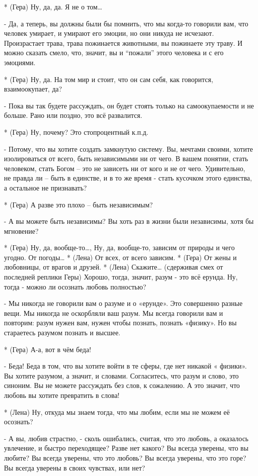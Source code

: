 * (Гера) Ну, да, да. Я не о том…

- Да, а теперь, вы должны были бы помнить, что мы когда-то говорили вам, что человек умирает, и умирают его эмоции, но они никуда не исчезают. Произрастает трава, трава пожинается животными, вы пожинаете эту траву. И можно сказать смело, что, значит, вы и “пожали” этого человека и с его эмоциями.

* (Гера) Ну, да. На том мир и стоит, что он сам себя, как говорится,  взаимоокупает, да?

- Пока вы так будете рассуждать, он будет стоять только на самоокупаемости и не больше. Рано  или поздно, это всё развалится.

* (Гера) Ну, почему? Это стопроцентный к.п.д.

- Потому, что вы хотите создать замкнутую систему. Вы, мечтами своими, хотите изолироваться от всего, быть независимыми ни от чего. В вашем понятии, стать человеком, стать Богом – это не зависеть ни от кого и не от чего. Удивительно, не правда ли – быть в единстве, и в то же время - стать кусочком этого единства, а остальное не признавать?

* (Гера) А разве это плохо – быть независимым?

- А вы можете быть независимы? Вы хоть раз в жизни были независимы, хотя бы мгновение?

* (Гера) Ну, да, вообще-то…, Ну, да,  вообще-то, зависим от природы и чего угодно. От погоды…
* (Лена) От всех, от всего зависим.
* (Гера) От жены и любовницы, от врагов и друзей.
* (Лена) Скажите… (сдерживая смех от последней реплики Геры) Хорошо, тогда, значит, разум - это всё ерунда. Ну, тогда - можно ли осознать любовь полностью?

- Мы никогда не говорили вам о разуме и о «ерунде». Это совершенно разные вещи. Мы никогда не оскорбляли ваш разум. Мы всегда говорили вам и повторим: разум нужен вам, нужен чтобы познать, познать «физику». Но вы стараетесь разумом познать и высшее.

* (Гера) А-а, вот в чём беда!

- Беда! Беда в том, что вы хотите войти в те сферы, где нет никакой « физики». Вы хотите разумом, а значит, и словами. Согласитесь, что разум и слово, это синоним. Вы не можете рассуждать без слов, к сожалению. А это значит, что любовь вы хотите превратить в слова!

* (Лена) Ну, откуда мы знаем тогда, что мы любим, если мы не можем её осознать?

- А вы, любив страстно, - сколь ошибались, считая, что это любовь, а оказалось увлечение, и быстро переходящее? Разве нет какого? Вы всегда уверены, что вы любите? Вы всегда уверены, что это любовь? Вы всегда уверены, что это горе? Вы всегда уверены в своих чувствах, или нет?

